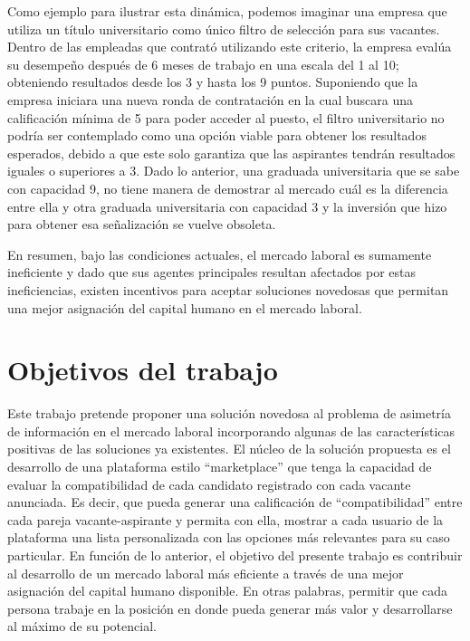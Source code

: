 Como ejemplo para ilustrar esta dinámica, podemos imaginar una empresa que utiliza un título universitario como único filtro de selección para sus vacantes. Dentro de las empleadas que contrató utilizando este criterio, la empresa evalúa su desempeño después de 6 meses de trabajo en una escala del 1 al 10; obteniendo resultados desde los 3 y hasta los 9 puntos. Suponiendo que la empresa iniciara una nueva ronda de contratación en la cual buscara una calificación mínima de 5 para poder acceder al puesto, el filtro universitario no podría ser contemplado como una opción viable para obtener los resultados esperados, debido a que este solo garantiza que las aspirantes tendrán resultados iguales o superiores a 3. Dado lo anterior, una graduada universitaria que se sabe con capacidad 9, no tiene manera de demostrar al mercado cuál es la diferencia entre ella y otra graduada universitaria con capacidad 3 y la inversión que hizo para obtener esa señalización se vuelve obsoleta.

En resumen, bajo las condiciones actuales, el mercado laboral es sumamente ineficiente y dado que sus agentes principales resultan afectados por estas ineficiencias, existen incentivos para aceptar soluciones novedosas que permitan una mejor asignación del capital humano en el mercado laboral.




\section{Objetivos del trabajo}
Este trabajo pretende proponer una solución novedosa al problema de asimetría de información en el mercado laboral incorporando algunas de las características positivas de las soluciones ya existentes. El núcleo de la solución propuesta es el desarrollo de una plataforma estilo “marketplace” que tenga la capacidad de evaluar la compatibilidad de cada candidato registrado con cada vacante anunciada. Es decir, que pueda generar una calificación de “compatibilidad” entre cada pareja vacante-aspirante y permita con ella, mostrar a cada usuario de la plataforma una lista personalizada con las opciones más relevantes para su caso particular.
En función de lo anterior, el objetivo del presente trabajo es contribuir al desarrollo de un mercado laboral más eficiente a través de una mejor asignación del capital humano disponible. En otras palabras, permitir que cada persona trabaje en la posición en donde pueda generar más valor y desarrollarse al máximo de su potencial. 

